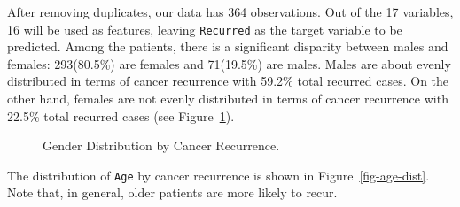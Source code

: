 \documentclass[
  letterpaper,
  DIV=11,
  numbers=noendperiod]{scrartcl}
\begin{document}
After removing duplicates, our data has 364 observations. Out of the 17
variables, 16 will be used as features, leaving \texttt{Recurred} as the
target variable to be predicted. Among the patients, there is a
significant disparity between males and females: 293(80.5\%) are females
and 71(19.5\%) are males. Males are about evenly distributed in terms of
cancer recurrence with 59.2\% total recurred cases. On the other hand,
females are not evenly distributed in terms of cancer recurrence with
22.5\% total recurred cases (see Figure~\ref{fig-gender-dist}).

\label{cell-fig-gender-dist}
\begin{figure}[H]


\caption{\label{fig-gender-dist}Gender Distribution by Cancer
Recurrence.}

\end{figure}%

The distribution of \texttt{Age} by cancer recurrence is shown in
Figure~\ref{fig-age-dist}. Note that, in general, older patients are
more likely to recur.
\end{document}
